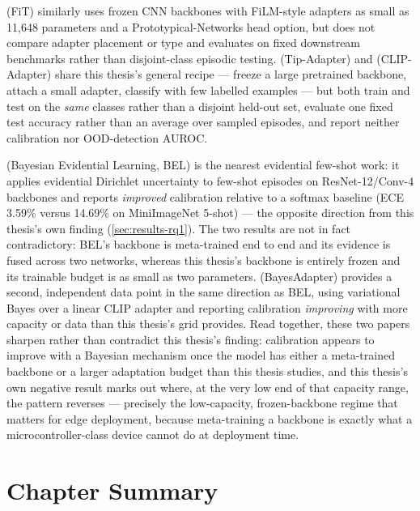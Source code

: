 \documentclass{iutbscthesis}
\begin{document}
\textcite{shysheya2023fit} (FiT) similarly uses frozen CNN backbones with FiLM-style adapters as small as 11{,}648 parameters and a Prototypical-Networks head option, but does not compare adapter placement or type and evaluates on fixed downstream benchmarks rather than disjoint-class episodic testing. \textcite{zhang2022tipadapter} (Tip-Adapter) and \textcite{gao2025clipadapter} (CLIP-Adapter) share this thesis's general recipe — freeze a large pretrained backbone, attach a small adapter, classify with few labelled examples — but both train and test on the \emph{same} classes rather than a disjoint held-out set, evaluate one fixed test accuracy rather than an average over sampled episodes, and report neither calibration nor OOD-detection AUROC.

\textcite{linghu2022bel} (Bayesian Evidential Learning, BEL) is the nearest evidential few-shot work: it applies evidential Dirichlet uncertainty to few-shot episodes on ResNet-12/Conv-4 backbones and reports \emph{improved} calibration relative to a softmax baseline (ECE 3.59\% versus 14.69\% on MiniImageNet 5-shot) — the opposite direction from this thesis's own finding (\autoref{sec:results-rq1}). The two results are not in fact contradictory: BEL's backbone is meta-trained end to end and its evidence is fused across two networks, whereas this thesis's backbone is entirely frozen and its trainable budget is as small as two parameters. \textcite{moralesalvarez2025bayesadapter} (BayesAdapter) provides a second, independent data point in the same direction as BEL, using variational Bayes over a linear CLIP adapter and reporting calibration \emph{improving} with more capacity or data than this thesis's grid provides. Read together, these two papers sharpen rather than contradict this thesis's finding: calibration appears to improve with a Bayesian mechanism once the model has either a meta-trained backbone or a larger adaptation budget than this thesis studies, and this thesis's own negative result marks out where, at the very low end of that capacity range, the pattern reverses — precisely the low-capacity, frozen-backbone regime that matters for edge deployment, because meta-training a backbone is exactly what a microcontroller-class device cannot do at deployment time.

\section{Chapter Summary}
\end{document}
